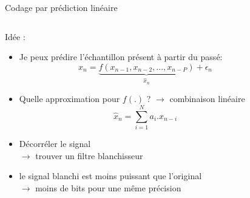 \documentclass[9pt, aspectratio=169]{beamer}
\begin{document}
\begin{frame}{Codage par prédiction linéaire} %

\begin{columns}
   \begin{column}{0.6\textwidth}
		
		Idée :
        \begin{itemize}
	        \item Je peux prédire l'échantillon présent à partir du passé: 
	        \begin{equation*}
	       		x_n = \underbrace{f(x_{n-1}, x_{n-2}, ..., x_{n-P})}_{\hat{x}_n}  + \epsilon_n
	        \end{equation*}
	        \item Quelle approximation pour $f(.)$ ? $\rightarrow$ combinaison linéaire
	        \begin{equation*}
	        	\hat{x}_n = \sum\limits_{i=1}^N a_i . x_{n-i}
	        \end{equation*}
            \item Décorréler le signal\\
            $\rightarrow$ trouver un filtre \og blanchisseur \fg{}
            \item le signal \og blanchi \fg{} est moins puissant que l'original \\
            $\rightarrow$ moins de bits pour une même précision
        \end{itemize}
        
   \end{column}
   \begin{column}{0.39\textwidth}
		
   \end{column}
\end{columns}
\end{frame}
\end{document}
